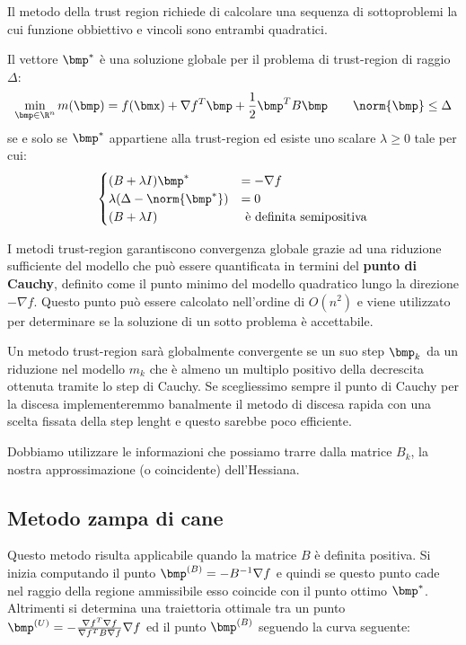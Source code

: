 \documentclass[\main/main.tex]{subfiles}
\begin{document}
Il metodo della trust region richiede di calcolare una sequenza di sottoproblemi la cui funzione obbiettivo e vincoli sono entrambi quadratici.

\begin{theorem}
    Il vettore \(\bmp^*\) è una soluzione globale per il problema di trust-region di raggio \(\Delta\):
    \[
        \min_{\bmp \in \R^n} m(\bmp) = f(\bmx) + \nabla f^T \bmp + \frac{1}{2}\bmp^T B\bmp \qquad \norm{\bmp} \leq \Delta
    \]
    se e solo se \(\bmp^*\) appartiene alla trust-region ed esiste uno scalare \(\lambda\geq 0\) tale per cui:
    \[
        \begin{cases}
            (B+\lambda I)\bmp^*             & = -\nabla f                     \\
            \lambda(\Delta - \norm{\bmp^*}) & = 0                             \\
            (B + \lambda I)                 & \text{ è definita semipositiva}
        \end{cases}
    \]
\end{theorem}

I metodi trust-region garantiscono convergenza globale grazie ad una riduzione sufficiente del modello che può essere quantificata in termini del \textbf{punto di Cauchy}, definito come il punto minimo del modello quadratico lungo la direzione \(-\nabla f\). Questo punto può essere calcolato nell'ordine di \(O(n^2)\) e viene utilizzato per determinare se la soluzione di un sotto problema è accettabile.

Un metodo trust-region sarà globalmente convergente se un suo step \(\bmp_k\) da un riduzione nel modello \(m_k\) che è almeno un multiplo positivo della decrescita ottenuta tramite lo step di Cauchy. Se scegliessimo sempre il punto di Cauchy per la discesa implementeremmo banalmente il metodo di discesa rapida con una scelta fissata della step lenght e questo sarebbe poco efficiente.

Dobbiamo utilizzare le informazioni che possiamo trarre dalla matrice \(B_k\), la nostra approssimazione (o coincidente) dell'Hessiana.

\subsection{Metodo zampa di cane}
Questo metodo risulta applicabile quando la matrice \(B\) è definita positiva. Si inizia computando il punto \(\bmp^{(B)} = -B^{-1}\nabla f\) e quindi se questo punto cade nel raggio della regione ammissibile esso coincide con il punto ottimo \(\bmp^*\). Altrimenti si determina una traiettoria ottimale tra un punto \(\bmp^{(U)} = -\frac{\nabla f^T \nabla f}{\nabla f^T B \nabla f} \nabla f\) ed il punto \(\bmp^{(B)}\) seguendo la curva seguente:
\end{document}
